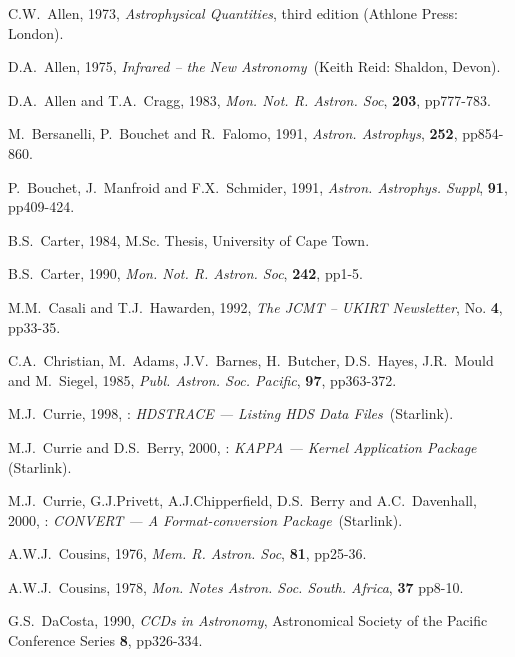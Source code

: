 \documentclass[twoside,11pt,nolof]{starlink}
\begin{document}
\newpage
{}
\begin{thebibliography}{99}

   C.W.~Allen, 1973, \textit{Astrophysical Quantities},
   third edition (Athlone Press: London).

   D.A.~Allen, 1975, \textit{Infrared -- the New
   Astronomy}\, (Keith Reid: Shaldon, Devon).

   D.A.~Allen and T.A.~Cragg, 1983, \textit{Mon. Not. R.
   Astron. Soc}, \textbf{203}, pp777-783.

   M.~Bersanelli, P.~Bouchet and R.~Falomo, 1991,
   \textit{Astron. Astrophys}, \textbf{252}, pp854-860.

   P.~Bouchet, J.~Manfroid and F.X.~Schmider, 1991,
   \textit{Astron. Astrophys. Suppl}, \textbf{91}, pp409-424.

   B.S.~Carter, 1984, M.Sc. Thesis, University of
   Cape Town.

   B.S.~Carter, 1990, \textit{Mon. Not. R. Astron. Soc},
   \textbf{242}, pp1-5.

   M.M.~Casali and T.J.~Hawarden, 1992, \textit{The
   JCMT -- UKIRT Newsletter}, No. \textbf{4}, pp33-35.

   C.A.~Christian, M.~Adams, J.V.~Barnes,
   H.~Butcher, D.S.~Hayes, J.R.~Mould and M.~Siegel, 1985, \textit{Publ.
   Astron. Soc. Pacific}, \textbf{97}, pp363-372.

   M.J.~Currie, 1998, :
   \textit{HDSTRACE --- Listing HDS Data Files}\, (Starlink).

   M.J.~Currie and D.S.~Berry, 2000,
   : \textit{KAPPA --- Kernel Application Package}\,
   (Starlink).

   M.J.~Currie, G.J.Privett, A.J.Chipperfield, D.S.~Berry
   and A.C.~Davenhall, 2000, : \textit{CONVERT ---
   A Format-conversion Package}\, (Starlink).

   A.W.J.~Cousins, 1976, \textit{Mem. R. Astron. Soc},
   \textbf{81}, pp25-36.

   A.W.J.~Cousins, 1978, \textit{Mon. Notes Astron. Soc.
   South. Africa}, \textbf{37} pp8-10.

   G.S.~DaCosta, 1990, \textit{CCDs in Astronomy},
   Astronomical Society of the Pacific Conference Series \textbf{8},
   pp326-334.


\end{thebibliography}
\end{document}
